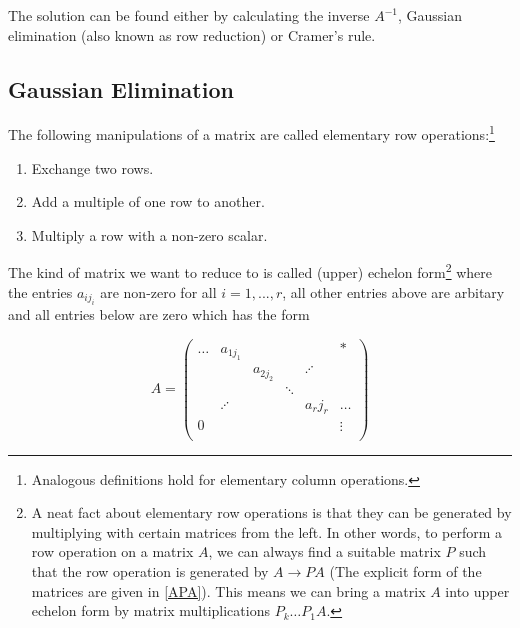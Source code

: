 \documentclass[a4paper,12pt]{report}
\begin{document}
The solution can be found either by calculating the inverse \(A^{-1} \), Gaussian elimination (also known as row reduction) or Cramer's rule.

\subsection{Gaussian Elimination}

\begin{definition}
The following manipulations of a matrix are called elementary row operations:\footnote{Analogous definitions hold for elementary column operations.}

\begin{enumerate}[label=(\(I\)\arabic*)]
    \item Exchange two rows.
    \item Add a multiple of one row to another.
    \item Multiply a row with a non-zero scalar.
\end{enumerate}

\end{definition}

The kind of matrix we want to reduce to is called (upper) echelon form\footnote{A neat fact about elementary row operations is that they can be generated by multiplying with certain matrices from the left. In other words, to perform a row operation on a matrix \(A\), we can always find a suitable matrix \(P\) such that the row operation is generated by \(A \rightarrow PA\) (The explicit form of the matrices are given in \cref{APA}). This means we can bring a matrix \(A\) into upper echelon form by matrix multiplications \(P_{k} \ldots P_{1}A \).}  where the entries \(a_{ij_{i} } \) are non-zero for all \(i = 1, ..., r\), all other entries above are arbitary and all entries below are zero which has the form

\begin{equation}
    A = \begin{pmatrix}
        \ldots & a_{1j_{1} }  &  &  &  & *  \\
         &  & a_{2j_{2} }  &  & \iddots    &   \\
         &  &  & \ddots  &  &   \\
         & \iddots &  &  & a_{r}j_{r}   & \ldots   \\
        0 &  &  &  &  & \vdots   \\
    \end{pmatrix}
\end{equation}
\end{document}
